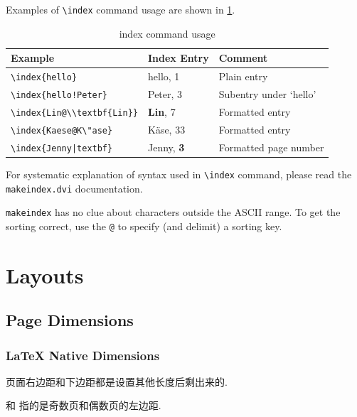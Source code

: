 \documentclass[a4paper,oneside]{book}
\newcommand{\sq}[1]{`#1'}
\newcommand{\command}[1]{\PVerb{#1}}
\begin{document}
Examples of \verb|\index| command usage are shown in \cref{tab:indexcommand}.
\begin{table}[htbp]
  \centering
\begin{tabular}[]{lll}
  \textbf{Example}&\textbf{Index Entry}&\textbf{Comment}\\
  \hline
  \verb|\index{hello}|&hello, 1&Plain entry\\
  \verb|\index{hello!Peter}|&\quad Peter, 3&Subentry under \sq{hello}\\
  \verb|\index{Lin@\\textbf{Lin}}|&\textbf{Lin}, 7&Formatted entry\\
  \verb|\index{Kaese@K\"ase}|&K\"{a}se, 33&Formatted entry\\
  \verb+\index{Jenny|textbf}+&Jenny, \textbf{3}&Formatted page number
\end{tabular}
\caption{index command usage}
\label{tab:indexcommand}
\end{table}
For systematic explanation of syntax used in \verb|\index| command, please read the \verb|makeindex.dvi| documentation. 

\verb|makeindex| has no clue about characters outside the ASCII range. To get the sorting correct, use the \verb|@| to specify (and delimit) a sorting key.

\part{Layouts}
\chapter{Page Dimensions}
\section{\LaTeX{} Native Dimensions}
\layout

页面右边距和下边距都是设置其他长度后剩出来的.

\command{\oddsidemargin} 和 \command{\evensidemargin} 指的是奇数页和偶数页的左边距.
\end{document}
